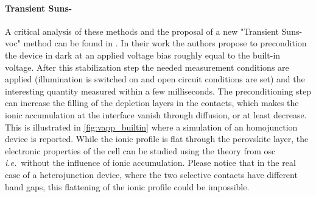 		\begin{figure}
		\end{figure}

		\paragraph{Transient Suns-}\label{transient_suns_voc}
		A critical analysis of these methods and the proposal of a new "Transient Suns-\gls{voc}" method can be found in .
		In their work the authors propose to precondition the device in dark at an applied voltage bias roughly equal to the built-in voltage.
		After this stabilization step the needed measurement conditions are applied (illumination is switched on and open circuit conditions are set) and the interesting quantity measured within a few milliseconds.
		The preconditioning step can increase the filling of the depletion layers in the contacts, which makes the ionic accumulation at the interface vanish through diffusion, or at least decrease.
		This is illustrated in \cref{fig:vapp_builtin} where a simulation of an homojunction device is reported.
		While the ionic profile is flat through the perovskite layer, the electronic properties of the cell can be studied using the theory from \gls{osc} \textsl{i.e.}\ without the influence of ionic accumulation.
		Please notice that in the real case of a heterojunction device, where the two selective contacts have different band gaps, this flattening of the ionic profile could be impossible.

